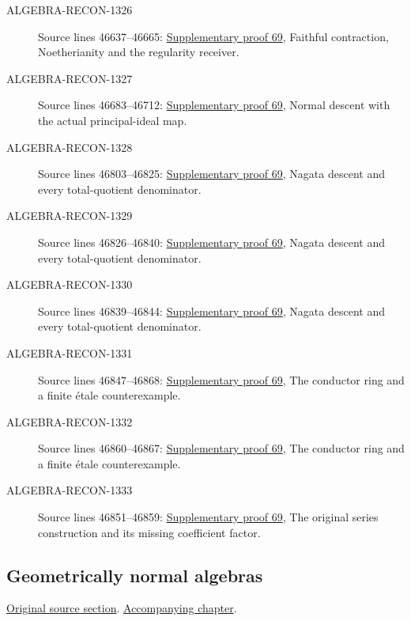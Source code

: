 \begin{description}
\item[ALGEBRA-RECON-1326] Source lines 46637--46665: \hyperlink{algebra_descent_notes_20260929}{Supplementary proof 69}, Faithful contraction, Noetherianity and the regularity receiver.
\item[ALGEBRA-RECON-1327] Source lines 46683--46712: \hyperlink{algebra_descent_notes_20260929}{Supplementary proof 69}, Normal descent with the actual principal-ideal map.
\item[ALGEBRA-RECON-1328] Source lines 46803--46825: \hyperlink{algebra_descent_notes_20260929}{Supplementary proof 69}, Nagata descent and every total-quotient denominator.
\item[ALGEBRA-RECON-1329] Source lines 46826--46840: \hyperlink{algebra_descent_notes_20260929}{Supplementary proof 69}, Nagata descent and every total-quotient denominator.
\item[ALGEBRA-RECON-1330] Source lines 46839--46844: \hyperlink{algebra_descent_notes_20260929}{Supplementary proof 69}, Nagata descent and every total-quotient denominator.
\item[ALGEBRA-RECON-1331] Source lines 46847--46868: \hyperlink{algebra_descent_notes_20260929}{Supplementary proof 69}, The conductor ring and a finite étale counterexample.
\item[ALGEBRA-RECON-1332] Source lines 46860--46867: \hyperlink{algebra_descent_notes_20260929}{Supplementary proof 69}, The conductor ring and a finite étale counterexample.
\item[ALGEBRA-RECON-1333] Source lines 46851--46859: \hyperlink{algebra_descent_notes_20260929}{Supplementary proof 69}, The original series construction and its missing coefficient factor.
\end{description}

\subsection{Geometrically normal algebras}
\hypertarget{algebra-source-section-geometrically-normal}{}
\noindent\href{https://github.com/stacks/stacks-project/blob/a04446e57ec1fbc252a871afcec7752fb2807b14/algebra.tex\#L46878}{Original source section}. \href{algebra.pdf\#nameddest=section-geometrically-normal}{Accompanying chapter}.


